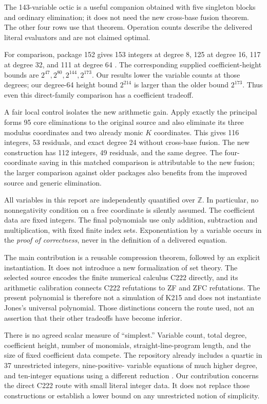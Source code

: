 \documentclass[10pt,letterpaper]{article}
\theoremstyle{remark}\newtheorem{remark}[theorem]{Remark}
\newcommand{\Z}{\mathbb Z}\newcommand{\Q}{\mathbb Q}\newcommand{\N}{\mathbb N}
\begin{document}
The 143-variable octic is a useful companion obtained with five singleton blocks and ordinary elimination; it does not need the new cross-base fusion theorem. The other four rows use that theorem. Operation counts describe the delivered literal evaluators and are not claimed optimal.

For comparison, package 152 gives 153 integers at degree 8, 125 at degree 16, 117 at degree 32, and 111 at degree 64 \cite{eliminate152}. The corresponding supplied coefficient-height bounds are $2^{47},2^{80},2^{144},2^{173}$. Our results lower the variable counts at those degrees; our degree-64 height bound $2^{214}$ is larger than the older bound $2^{173}$. Thus even this direct-family comparison has a coefficient tradeoff.

A fair local control isolates the new arithmetic gain. Apply exactly the principal form\textquotesingle s 95 core eliminations to the original source and also eliminate its three modulus coordinates and two already monic $K$ coordinates. This gives 116 integers, 53 residuals, and exact degree 24 without cross-base fusion. The new construction has 112 integers, 49 residuals, and the same degree. The four-coordinate saving in this matched comparison is attributable to the new fusion; the larger comparison against older packages also benefits from the improved source and generic elimination.


All variables in this report are independently quantified over $\Z$.
In particular, no nonnegativity condition on a free coordinate is silently
assumed. The coefficient data are fixed integers. The final polynomials
use only addition, subtraction and multiplication, with fixed finite
index sets. Exponentiation by a variable occurs in the \emph{proof of
correctness}, never in the definition of a delivered equation.

The main contribution is a reusable compression theorem, followed by an
explicit instantiation. It does not introduce a new formalization of set
theory. The selected source encodes the finite numerical calculus C222
directly, and its arithmetic calibration connects C222 refutations to
ZF and ZFC refutations. The present polynomial is therefore not a
simulation of K215 and does not instantiate Jones's universal polynomial.
Those distinctions concern the route used, not an assertion that their
other tradeoffs have become inferior.

There is no agreed scalar measure of ``simplest.'' Variable count, total
degree, coefficient height, number of monomials, straight-line-program
length, and the size of fixed coefficient data compete. The repository
already includes a quartic in 37 unrestricted integers, nine-positive-
variable equations of much higher degree, and ten-integer equations
using a different reduction \cite{corpus}. Our contribution concerns the
direct C222 route with small literal integer data. It does not replace
those constructions or establish a lower bound on any unrestricted
notion of simplicity.
\end{document}
